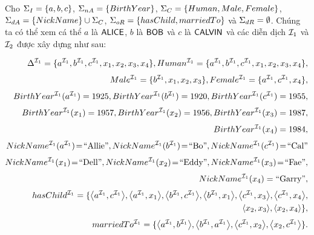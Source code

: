 \begin{Example}
\label{ex:LSPLanguage}
	Cho $\Sigma_I = \{a, b, c\}$, $\Sigma_{nA} = \{BirthYear\}$, $\Sigma_C = \{Human, Male, Female\}$, $\Sigma_{dA} = \{NickName\} \cup \Sigma_C$, $\Sigma_{oR} = \{hasChild, marriedTo\}$ và $\Sigma_{dR} = \emptyset$. 
	Chúng ta có thể xem cá thể $a$ là $\mathsf{ALICE}$, $b$ là $\mathsf{BOB}$ và $c$ là $\mathsf{CALVIN}$ và các diễn dịch $\mathcal{I}_1$ và $\mathcal{I}_2$ được xây dựng như sau:
	
	\noindent
	\allowdisplaybreaks
	\begin{eqnarray*}
		& &\!\!\!\!\!\!\! \Delta^{\mI_1} = \{a^{\mI_1}, b^{\mI_1}, c^{\mI_1}, x_1, x_2, x_3, x_4\}, 
		\Human^{\mI_1} = \{a^{\mI_1}, b^{\mI_1}, c^{\mI_1}, x_1, x_2, x_3, x_4\},\\[0.7ex]
		& &\!\!\!\!\!\!\! \Male^{\mI_1} = \{b^{\mI_1}, x_1, x_2, x_3\},
		\Female^{\mI_1} = \{a^{\mI_1}, c^{\mI_1}, x_4\},\\[0.7ex]
		& &\!\!\!\!\!\!\! \BirthYear^{\mI_1}(a^{\mI_1}) = 1925,
		\BirthYear^{\mI_1}(b^{\mI_1}) = 1920,
		\BirthYear^{\mI_1}(c^{\mI_1}) = 1955,\\[0.7ex]
		& &\!\!\!\!\!\!\! \BirthYear^{\mI_1}(x_1) = 1957,
		\BirthYear^{\mI_1}(x_2) = 1956,
		\BirthYear^{\mI_1}(x_3) = 1987,\\[0.7ex]
		& &\!\!\!\!\!\!\! \BirthYear^{\mI_1}(x_4) = 1984,\\[0.7ex]
		& &\!\!\!\!\!\!\! \NickName^{\mI_1}(a^{\mI_1})\! =\! \text{``Allie''},
		\NickName^{\mI_1}(b^{\mI_1})\! =\! \text{``Bo''},
		\NickName^{\mI_1}(c^{\mI_1})\! =\! \text{``Cal''}\\[0.7ex]
		& &\!\!\!\!\!\!\! \NickName^{\mI_1}(x_1)\! =\! \text{``Dell''},
		\NickName^{\mI_1}(x_2)\! =\! \text{``Eddy''},
		\NickName^{\mI_1}(x_3)\! =\! \text{``Fae''},\\[0.7ex]
		& &\!\!\!\!\!\!\! \NickName^{\mI_1}(x_4) = \text{``Garry''},\\[0.7ex]
		& &\!\!\!\!\!\!\! \hasChild^{\mI_1} = \{\tuple{a^{\mI_1}, c^{\mI_1}}, \tuple{a^{\mI_1}, x_1}, \tuple{b^{\mI_1}, c^{\mI_1}}, \tuple{b^{\mI_1}, x_1}, \tuple{c^{\mI_1}, x_3}, \tuple{c^{\mI_1}, x_4},\\
		& &\!\!\!\!\!\!\! \qquad\qquad\qquad\;\;\;\tuple{x_2, x_3}, \tuple{x_2, x_4}\,\},\\[0.7ex]
		& &\!\!\!\!\!\!\! \marriedTo^{\mI_1} = \{\tuple{a^{\mI_1},b^{\mI_1}}, \tuple{b^{\mI_1}, a^{\mI_1}}, \tuple{c^{\mI_1},x_2}, \tuple{x_2,c^{\mI_1}}\,\}.
	\end{eqnarray*}
	

\end{Example}
